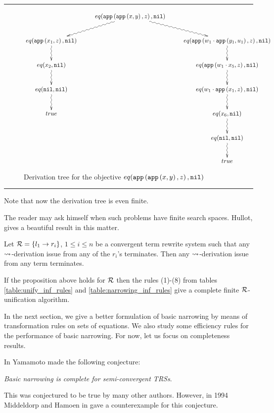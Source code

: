 \begin{landscape}
	\thispagestyle{empty}
	\hrule
	\begin{figure}[!ht]
		\begin{displaymath}
			\xymatrix{
				& eq(\appFunc{\appFunc{x}{y}}{z}, \nilList) \ar@{~>}[dr] \ar@{~>}[dl] \\
				eq(\appFunc{x_1}{z},\nilList) \ar@{~>}[d] & & eq(\appFunc{w_1 \cdot \appFunc{y_1}{u_1}}{z}, \nilList) \ar@{~>}[d]\\
				eq(x_2,\nilList) \ar@{~>}[d] & & eq(\appFunc{w_1 \cdot x_5}{z}, \nilList) \ar@{~>}[d]\\
				eq(\nilList, \nilList) \ar@{~>}[d]& & eq(w_1 \cdot \appFunc{x_1}{z}, \nilList) \ar@{~>}[d]\\
				true & & eq(x_6, \nilList) \ar@{~>}[d]\\
				& & eq(\nilList, \nilList) \ar@{~>}[d]\\
				& & true
			}
		\end{displaymath}
		\caption{Derivation tree for the objective $eq(\mathtt{app}\left(\mathtt{app}\left(x,y\right),z\right), \mathtt{nil})$}
		\label{figure:example:app:derivation-tree-basic-narrowing}
	\end{figure}
	\hrule
	\vspace{1cm}
	Note that now the derivation tree is even finite.
\end{landscape}

The reader may ask himself when such problems have finite search spaces. Hullot, \cite{hullot:cfunif} gives a beautiful result in this matter.

\begin{proposition}
	Let $\mathcal{R} = \{ l_1 \rightarrow r_i \}$, $1 \leq i \leq n$ be a convergent term rewrite system such that any $\mathbin{\rightsquigarrow}$-derivation issue from any of the $r_i$'s terminates. Then any $\mathbin{\rightsquigarrow}$-derivation issue from any term terminates.
\end{proposition}

If the proposition above holds for $\mathcal{R}$ then the rules (1)-(8) from tables \ref{table:unify_inf_rules} and \ref{table:narrowing_inf_rules} give a complete finite $\mathcal{R}$-unification algorithm.

In the next section, we give a better formulation of basic narrowing by means of transformation rules on sets of equations. We also study some efficiency rules for the performance of basic narrowing. For now, let us focus on completeness results.

In \cite{10.1007/3-540-51564-X_51} Yamamoto made the following conjecture:
\begin{center}
    \textit{Basic narrowing is complete for semi-convergent TRSs}.
\end{center}
This was conjectured to be true by many other authors. However, in 1994 Middeldorp and Hamoen in \cite{Middeldorp1994} gave a counterexample for this conjecture.

